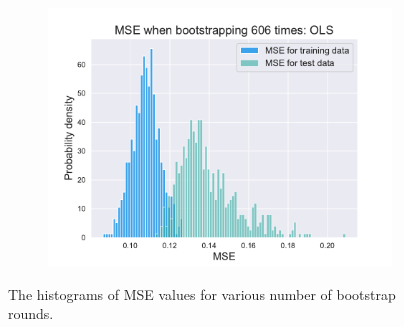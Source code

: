 \documentclass[twocolumn,english,notitlepage]{article}
\begin{document}
\begin{appendices}
\begin{figure}
\begin{subfigure}{.5\textwidth}
                \includegraphics[width=\linewidth]{BS_hist_bootstraped_606_rounds_of_degree_7.pdf}
                \caption{}
                \label{app:fig:histograms for rounds:606}
            \end{subfigure}

            \caption{The histograms of MSE values for various number of bootstrap rounds. }
            \label{app:fig:histograms for rounds}
        \end{figure}

\end{appendices}

\printbibliography
\end{document}
